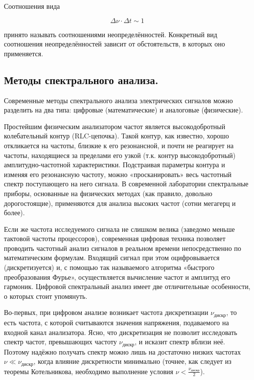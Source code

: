 \documentclass[a4paper,12pt]{article}
\begin{document}
Соотношения вида

\[\Delta \nu \cdot \Delta t \sim 1\]

принято называть соотношениями неопределённостей. Конкретный вид соотношения неопределённостей зависит от обстоятельств, в которых оно применяется.

\subsection*{Методы спектрального анализа.}

Современные методы спектрального
анализа электрических сигналов можно разделить на два типа: цифровые (математические) и аналоговые (физические).

Простейшим физическим анализатором частот является высокодобротный колебательный контур (RLC-цепочка). Такой контур, как известно, хорошо откликается на частоты, близкие к его резонансной, и почти не реагирует на частоты, находящиеся за пределами его узкой (т.к. контур высокодобротный) амплитудно-частотной характеристики. Подстраивая параметры контура и изменяя его резонансную частоту, можно «просканировать» весь частотный спектр поступающего на него сигнала. В современной лаборатории спектральные приборы, основанные на физических методах (как правило, довольно дорогостоящие), применяются для анализа высоких частот (сотни мегагерц и более).

Если же частота исследуемого сигнала не слишком велика (заведомо
меньше тактовой частоты процессоров), современная цифровая техника позволяет проводить частотный анализ сигналов в реальном времени непосредственно по математическим формулам. Входящий сигнал при этом оцифровывается (дискретизуется) и, с помощью так называемого алгоритма «быстрого преобразования Фурье», осуществляется вычисление частот и амплитуд его гармоник.
Цифровой спектральный анализ имеет две отличительные особенности, о
которых стоит упомянуть.

Во-первых, при цифровом анализе возникает частота дискретизации $\nu_{\text{дискр}}$, то есть частота, с которой считываются значения напряжения, подаваемого на входной канал анализатора. Ясно, что дискретизация не позволит исследовать спектр частот, превышающих частоту $\nu_{\text{дискр}}$, и исказит спектр
вблизи неё. Поэтому надёжно получать спектр можно лишь на достаточно
низких частотах $\nu \ll \nu_{\text{дискр}}$, когда влияние дискретности минимально (точнее,
как следует из теоремы Котельникова, необходимо выполнение условия
$\nu < \frac{\nu_{\text{дискр}}}{2}$).
\end{document}
